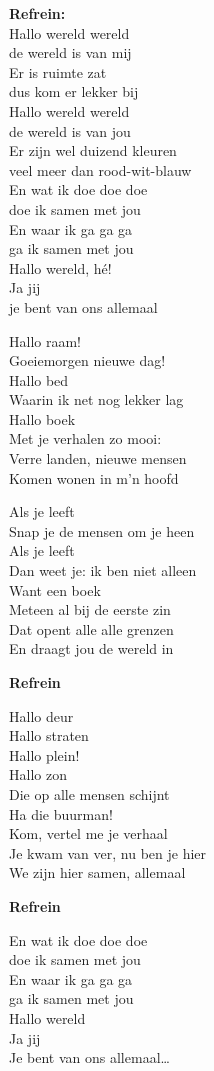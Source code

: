 \textbf{Refrein:}\\
Hallo wereld wereld\\
de wereld is van mij\\
Er is ruimte zat\\
dus kom er lekker bij\\
Hallo wereld wereld\\
de wereld is van jou\\
Er zijn wel duizend kleuren\\
veel meer dan rood-wit-blauw\\
En wat ik doe doe doe\\
doe ik samen met jou\\
En waar ik ga ga ga\\
ga ik samen met jou\\
Hallo wereld, hé!\\
Ja jij\\
je bent van ons allemaal

Hallo raam!\\
Goeiemorgen nieuwe dag!\\
Hallo bed\\
Waarin ik net nog lekker lag\\
Hallo boek\\
Met je verhalen zo mooi:\\
Verre landen, nieuwe mensen\\
Komen wonen in m’n hoofd

Als je leeft\\
Snap je de mensen om je heen\\
Als je leeft\\
Dan weet je: ik ben niet alleen\\
Want een boek\\
Meteen al bij de eerste zin\\
Dat opent alle alle grenzen\\
En draagt jou de wereld in

\textbf{Refrein}

Hallo deur\\
Hallo straten\\
Hallo plein!\\
Hallo zon\\
Die op alle mensen schijnt\\
Ha die buurman!\\
Kom, vertel me je verhaal\\
Je kwam van ver, nu ben je hier\\
We zijn hier samen, allemaal

\textbf{Refrein}

En wat ik doe doe doe\\
doe ik samen met jou\\
En waar ik ga ga ga\\
ga ik samen met jou\\
Hallo wereld\\
Ja jij\\
Je bent van ons allemaal…